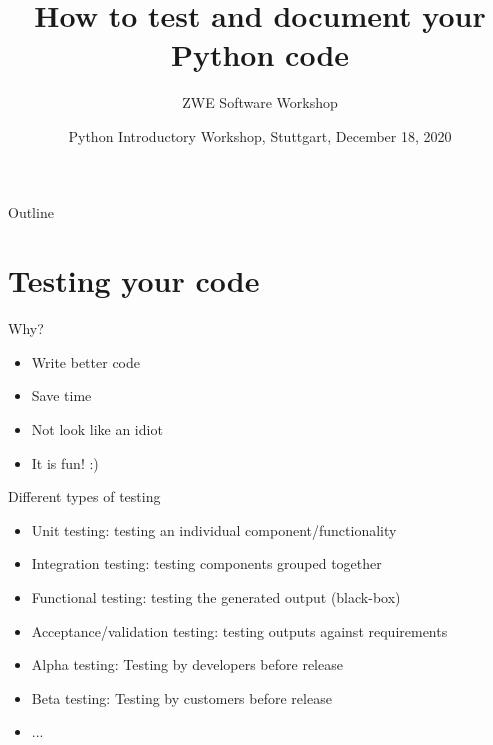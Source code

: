 \documentclass[compress,english,aspectratio=1610]{beamer}
\title{How to test and document your Python code}
\author{ZWE Software Workshop}
\institute{Max-Planck-Institut f\"ur Intelligente Systeme}
\date{\small{Python Introductory Workshop, Stuttgart, December 18, 2020}}
\let\olditem\item
\renewcommand{\item}{\setlength{\itemsep}{\fill}\olditem}
\begin{document}
\begin{frame}[plain,label=thetitle]
 \titlepage
\end{frame}



\begin{frame}{Outline}
	\tableofcontents
\end{frame}

\section{Testing your code}
\begin{frame}{Why?}
    \begin{itemize}
        \item Write better code
        \item Save time
        \item Not look like an idiot
        \item It is fun! :)
    \end{itemize}
\end{frame}

\begin{frame}{Different types of testing}
    \begin{itemize}
        \item Unit testing: testing an individual component/functionality
        \item Integration testing: testing components grouped together
        \item Functional testing: testing the generated output (black-box)
        \item Acceptance/validation testing: testing outputs against requirements
        \item Alpha testing: Testing by developers before release
        \item Beta testing: Testing by customers before release
        \item ...
    \end{itemize}
\end{frame}
\end{document}
